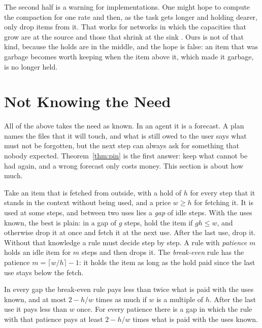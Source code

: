 \documentclass[acmsmall,nonacm,screen]{acmart}
\begin{document}
The second half is a warning for implementations. One might hope to compute the compaction
for one rate and then, as the task gets longer and holding dearer, only drop items from it.
That works for networks in which the capacities that grow are at the source and those that
shrink at the sink \citep{Gallo1989}. Ours is not of that kind, because the holds are in the
middle, and the hope is false: an item that was garbage becomes worth keeping when the item
above it, which made it garbage, is no longer held.

\section{Not Knowing the Need}\label{sec:online}

All of the above takes the need as known. In an agent it is a forecast. A plan names the
files that it will touch, and what is still owed to the user \citep{tpp12} says what must
not be forgotten, but the next step can always ask for something that nobody expected.
Theorem~\ref{thm:pin} is the first answer: keep what cannot be had again, and a wrong
forecast only costs money. This section is about how much.

Take an item that is fetched from outside, with a hold of $h$ for every step that it stands
in the context without being used, and a price $w \ge h$ for fetching it. It is used at some
steps, and between two uses lies a \emph{gap} of idle steps. With the uses known, the best
is plain: in a gap of $g$ steps, hold the item if $g h \le w$, and otherwise drop it at once
and fetch it at the next use. After the last use, drop it. Without that knowledge a rule
must decide step by step. A rule with \emph{patience} $m$ holds an idle item for $m$ steps
and then drops it. The \emph{break-even} rule has the patience $m = \lceil w/h \rceil - 1$:
it holds the item as long as the hold paid since the last use stays below the fetch.

\begin{theorem}\label{thm:online}
In every gap the break-even rule pays less than twice what is paid with the uses known, and
at most $2 - h/w$ times as much if $w$ is a multiple of $h$. After the last use it pays less
than $w$ once. For every patience there is a gap in which the rule with that patience pays
at least $2 - h/w$ times what is paid with the uses known.
\end{theorem}
\end{document}
